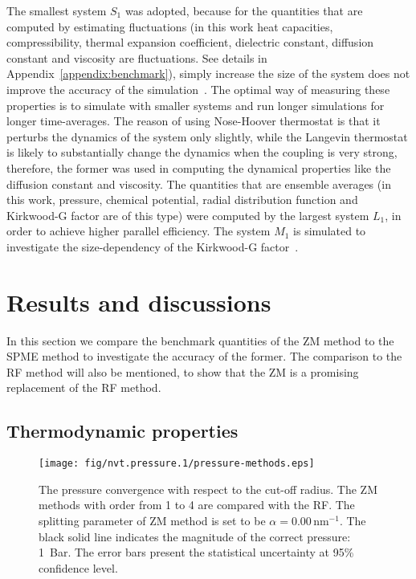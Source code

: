 \documentclass[aip,jcp,a4paper,preprint,unsortedaddress,onecolumn,fleqn]{revtex4-1}
\newcommand{\systemsb}{S_1}
\newcommand{\systemmb}{M_1}
\newcommand{\systemlb}{L_1}
\begin{document}

The smallest system $\systemsb$ was adopted,
because for the quantities that are computed  by estimating fluctuations (in this
work heat capacities, compressibility, thermal expansion coefficient, dielectric constant, diffusion constant and
viscosity are fluctuations. See details in Appendix~\ref{appendix:benchmark}), simply increase the size of the
system does not improve the accuracy of the 
simulation~\cite{milchev1986fluctuations,ferrenberg1991statistical}.
The optimal way of measuring these properties
is to simulate with smaller systems
and run longer simulations for longer time-averages.
The reason of using Nose-Hoover thermostat is that
it perturbs the dynamics of the system only slightly, while the
Langevin thermostat is likely to substantially change the dynamics
when the coupling is very strong, therefore, the former was used in computing the dynamical
properties like the diffusion constant and viscosity.
The quantities that
are ensemble averages (in this work, pressure, chemical potential, radial distribution function and Kirkwood-G factor are of this type)
were computed by the largest system $\systemlb$,
in order to achieve higher parallel efficiency.
The system $\systemmb$ is simulated to investigate the size-dependency of the
Kirkwood-G factor~\cite{vanderSpoel2006origin}.

\section{Results and discussions}

In this section we compare the benchmark quantities of the ZM method
to the SPME method to investigate the accuracy of the former.
The comparison to the RF method will also be mentioned, to show that
the ZM is a promising replacement of the RF method.

\subsection{Thermodynamic properties}

\begin{figure}
  \centering
  \texttt{[image: fig/nvt.pressure.1/pressure-methods.eps]}
  \caption{The pressure convergence with respect to the cut-off radius.
    The ZM methods with order from 1 to 4 are compared with the RF. 
    The splitting parameter of ZM method is set to be $\alpha = 0.00\,\textrm{nm}^{-1}$.
    The black solid line indicates the magnitude  of the correct pressure: 1~Bar.
    The error bars present the statistical uncertainty at 95\% confidence level.
  }
  \label{fig:pres-comp}
\end{figure}
\end{document}

